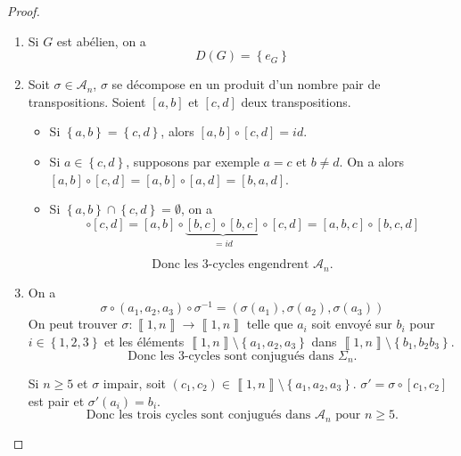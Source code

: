 \begin{proof}
	\phantom{}
	\begin{enumerate}
		\item Si $G$ est abélien, on a 
		\begin{equation}
			\boxed{D(G)=\left\{e_{G}\right\}}
		\end{equation}
		\item Soit $\sigma\in\mathcal{A}_{n}$, $\sigma$ se décompose en un produit d'un nombre pair de transpositions. Soient $[a,b]$ et $[c,d]$ deux transpositions.
		\begin{itemize}
			\item Si $\left\{a,b\right\}=\left\{c,d\right\}$, alors $[a,b]\circ[c,d]=id$.
			\item Si $a\in\left\{c,d\right\}$, supposons par exemple $a=c$ et $b\neq d$. On a alors $[a,b]\circ[c,d]=[a,b]\circ[a,d]=[b,a,d]$.
			\item Si $\left\{a,b\right\}\cap\left\{c,d\right\}=\emptyset$, on a 
			\begin{equation}
				[a,b]\circ[c,d]=[a,b]\circ\underbrace{[b,c]\circ[b,c]}_{=id}\circ[c,d]=[a,b,c]\circ[b,c,d]
			\end{equation}
		\end{itemize}
		\begin{equation}
			\boxed{\text{Donc les 3-cycles engendrent }\mathcal{A}_{n}.}
		\end{equation}

		\item On a 
		\begin{equation}
			\sigma\circ(a_{1},a_{2},a_{3})\circ\sigma^{-1}=(\sigma(a_{1}),\sigma(a_{2}),\sigma(a_{3}))
		\end{equation}
		On peut trouver $\sigma\colon\left\llbracket 1,n\right\rrbracket \to\left\llbracket 1,n\right\rrbracket$ telle que $a_{i}$ soit envoyé sur $b_{i}$ pour $i\in\left\{1,2,3\right\}$ et les éléments $\left\llbracket 1,n\right\rrbracket \setminus\left\{a_{1},a_{2},a_{3}\right\}$ dans $\left\llbracket 1,n\right\rrbracket\setminus\left\{b_{1},b_{2}b_{3}\right\}$.
		\begin{equation}
			\boxed{\text{Donc les 3-cycles sont conjugués dans }\Sigma_{n}.}
		\end{equation}

		Si $n\geqslant5$ et $\sigma$ impair, soit $(c_{1},c_{2})\in\left\llbracket 1,n\right\rrbracket\setminus\left\{a_{1},a_{2},a_{3}\right\}$. $\sigma'=\sigma\circ[c_{1},c_{2}]$ est pair et $\sigma'(a_{i})=b_{i}$. 
		\begin{equation}
			\boxed{\text{Donc les trois cycles sont conjugués dans }\mathcal{A}_{n}\text{ pour }n\geqslant5.}
		\end{equation}
		

\end{enumerate}
\end{proof}
